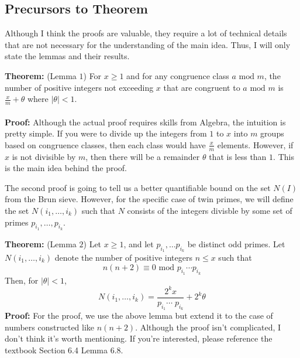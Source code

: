 \subsection{Precursors to Theorem}
Although I think the proofs are valuable, they require a lot of technical details that are not necessary for the understanding of the main idea. Thus, I will only state the lemmas and their results.
\begin{boxedsection}
    \textbf{Theorem:} (Lemma $1$) For $x \geq 1$ and for any congruence class $a \text{ mod } m$, the number of positive integers not exceeding $x$ that are congruent to $a \text{ mod } m$ is $\frac{x}{m} + \theta$ where $|\theta| < 1$. \\
    \\
    \textbf{Proof:} Although the actual proof requires skills from Algebra, the intuition is pretty simple. If you were to divide up the integers from $1$ to $x$ into $m$ groups based on congruence classes, then each class would have $\frac{x}{m}$ elements. However, if $x$ is not divisible by $m$, then there will be a remainder $\theta$ that is less than $1$. This is the main idea behind the proof.
\end{boxedsection}
The second proof is going to tell us a better quantifiable bound on the set $N(I)$ from the Brun sieve. However, for the specific case of twin primes, we will define the set $N(i_1, \dots, i_k)$ such that $N$ consists of the integers divisble by some set of primes $p_{i_1}, \dots, p_{i_k}$.
\begin{boxedsection}
    \textbf{Theorem:} (Lemma $2$) Let $x \geq 1$, and let $p_{i_1}, \dots p_{i_k}$ be distinct odd primes. Let $N(i_1, \dots, i_k)$ denote the number of positive integers $n \leq x$ such that
    $$
    n(n+2) \equiv 0 \text{ mod } p_{i_1} \cdots p_{i_k}
    $$
    Then, for $|\theta| < 1$,
    $$
    N(i_1, \dots, i_k) = \frac{2^k x}{p_{i_1} \cdots \;p_{i_k}} + 2^k\theta
    $$
    \textbf{Proof:} For the proof, we use the above lemma but extend it to the case of numbers constructed like $n(n+2)$. Although the proof isn't complicated, I don't think it's worth mentioning. If you're interested, please reference the textbook Section 6.4 Lemma 6.8.
\end{boxedsection}

